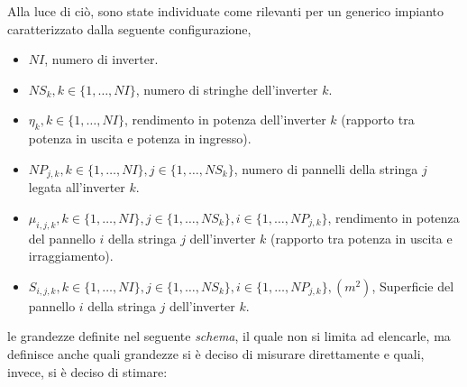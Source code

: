 %
Alla luce di ci\`o, sono state individuate come rilevanti per un generico impianto 
caratterizzato dalla seguente configurazione,
%
\begin{itemize}
\item $NI$, numero di inverter.
\item $NS_k, k \in \{1, \dots, NI\}$, numero di stringhe dell'inverter $k$.
\item $\eta _{k}, k \in \{1, \dots, NI\}$, rendimento in potenza
  dell'inverter $k$ (rapporto tra
  potenza in uscita e potenza in ingresso).
\item $NP_{j,k}, k \in \{1, \dots, NI\}, j \in \{1, \dots, NS_k\}$, numero
  di pannelli della stringa $j$ legata all'inverter $k$.
\item $\mu _{i,j,k}, k \in \{1, \dots, NI\}, j \in \{1, \dots, NS_k\}, i \in
  \{1, \dots, NP_{j,k}\}$, rendimento in potenza del pannello $i$ della stringa
  $j$ dell'inverter $k$ (rapporto tra  potenza in uscita e irraggiamento).
\item $S _{i,j,k}, k \in \{1, \dots, NI\}, j \in \{1, \dots, NS_k\}, i \in
  \{1, \dots, NP_{j,k}\}, (m^2)$, Superficie del pannello $i$ della stringa
  $j$ dell'inverter $k$.
\end{itemize}
%
le grandezze definite nel seguente \emph{schema}, il quale non si limita ad elencarle, 
ma definisce anche quali grandezze si \`e deciso di misurare direttamente e 
quali, invece, si \`e deciso di stimare:
%
